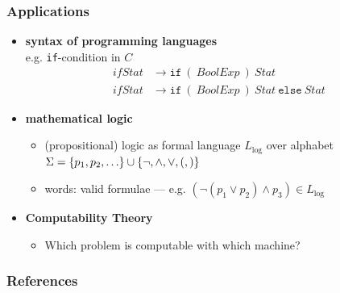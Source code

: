 \documentclass{beamer}
\newcommand{\person}[1]{\textsc{#1}}
\begin{document}
	\begin{frame} \frametitle{Applications}
		\begin{itemize}
			\item<+-> \textbf{syntax of programming languages} \\
			e.g. \texttt{if}-condition in $C$
				\begin{equation*}
					\begin{aligned}
					ifStat &\to \texttt{if} \ ( \ BoolExp \ ) \ Stat \\
					ifStat &\to \texttt{if} \ ( \ BoolExp \ ) \ Stat \ \texttt{else} \ Stat
					\end{aligned}
				\end{equation*}
			\item<+-> \textbf{mathematical logic}
			\begin{itemize}
				\item (propositional) logic as formal language $L_{\log}$ over alphabet $\Sigma = \menge{p_1, p_2, \dots} \cup \menge{\lnot, \land, \lor, (,)}$
				\item words: valid formulae --- e.g. $(\lnot (p_1 \lor p_2) \land p_3) \in L_{\log}$
			\end{itemize}
			\item<+-> \textbf{Computability Theory}
			\begin{itemize}
				\item Which problem is computable with which machine?
			\end{itemize}
		\end{itemize}
	\end{frame}


	\begin{frame}[shrink=30] \frametitle{References}
		\nocite{*}	
		
		
	\end{frame}

	
	\appendix
	\begin{frame}
	\end{frame}
\end{document}
